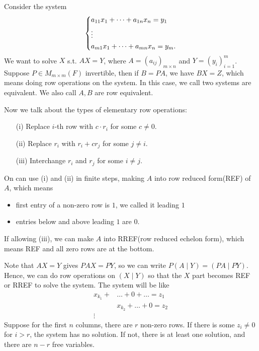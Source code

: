 Consider the system 
\[
    \begin{dcases}
        a_{11} x_1 + \dots + a_{1n} x_n = y_1 \\
        \vdots \\
        a_{m1} x_1 + \dots + a_{mn} x_n = y_m.
    \end{dcases}
\]
We want to solve \(X\) s.t. \(AX = Y\), where \(A = (a_{ij})_{m \times n}\) and \(Y = (y_{i})_{i=1}^m\). Suppose \(P \in M_{m \times m}(F)\) invertible, then if \(B = PA\), we have \(BX=Z\), which means doing row operations on the system. In this case, we call two systems are equivalent. We also call \(A, B\) are row equivalent. 

Now we talk about the types of elementary row operations: 
\begin{itemize}
    \item [(i)] Replace \(i\)-th row with \(c \cdot r_i\) for some \(c \neq 0\). 
    \item [(ii)] Replace \(r_i\) with \(r_i + c r_j\) for some \(j \neq i\). 
    \item [(iii)] Interchange \(r_i\) and \(r_j\) for some \(i \neq j\).       
\end{itemize}

On can use (i) and (ii) in finite steps, making \(A\) into row reduced form(REF) of \(A\), which means   
\begin{itemize}
    \item first entry of a non-zero row is \(1\), we called it leading \(1\)
    \item entries below and above leading \(1\) are \(0\).   
\end{itemize}

If allowing (iii), we can make \(A\) into RREF(row reduced echelon form), which means REF and all zero rows are at the bottom.

Note that \(AX=Y\) gives \(PAX=PY\), so we can write \(P(A \mid Y) = (PA \mid PY)\). Hence, we can do row operations on \((X \mid Y)\) so that the \(X\) part becomes REF or RREF to solve the system. 
The system will be like 
\begin{align*}
    x_{k_1} + &\dots + 0 + \dots = z_1 \\
            &x_{k_2} + \dots + 0 = z_2 \\
    \vdots& 
\end{align*} 
Suppose for the first \(n\) columns, there are \(r\) non-zero rows. If there is some \(z_i \neq 0\) for \(i > r\), the system has no solution. If not, there is at least one solution, and there are \(n - r\) free variables. 

